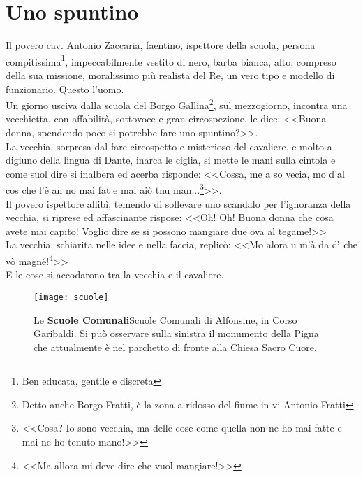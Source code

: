
\chapter{Uno spuntino}
Il povero cav. Antonio Zaccaria, faentino, ispettore della scuola, persona compitissima\footnote{Ben educata, gentile e discreta}, impeccabilmente vestito di nero, barba bianca, alto, compreso della sua missione, moralissimo più realista del Re, un vero tipo e modello di funzionario. Questo l'uomo.\\
\indent Un giorno usciva dalla scuola del Borgo Gallina\footnote{Detto anche Borgo Fratti, è la zona a ridosso del fiume in vi Antonio Fratti}, sul mezzogiorno, incontra una vecchietta, con affabilità, sottovoce e gran circospezione, le dice: <<Buona donna, spendendo poco si potrebbe fare uno spuntino?>>.\\
\indent La vecchia, sorpresa dal fare circospetto e misterioso del cavaliere, e molto a digiuno della lingua di Dante, inarca le ciglia, si mette le mani sulla cintola e come suol dire si inalbera ed acerba risponde: <<Cossa, me a so vecia, mo d'al cos che l'è an no mai fat e mai aiò tnu man...\footnote{<<Cosa? Io sono vecchia, ma delle cose come quella non ne ho mai fatte e mai ne ho tenuto mano!>>}>>.\\
\indent Il povero ispettore allibì, temendo di sollevare uno scandalo per l'ignoranza della vecchia, si riprese ed affascinante rispose: <<Oh! Oh! Buona donna che cosa avete mai capito! Voglio dire se si possono mangiare due ova al tegame!>>\\
\indent La vecchia, schiarita nelle idee e nella faccia, replicò: <<Mo alora u m'à da dì che vò magné!\footnote{<<Ma allora mi deve dire che vuol mangiare!>>}>>\\
\indent E le cose si accodarono tra la vecchia e il cavaliere.

 \begin{figure}[htb]
    \centering
    \texttt{[image: scuole]}
    \caption[Scuole Comunali]{Le \textbf{Scuole Comunali}Scuole Comunali di Alfonsine, in Corso Garibaldi. Si può osservare sulla sinistra il monumento della Pigna che attualmente è nel parchetto di fronte alla Chiesa Sacro Cuore.\label{fig:scuole}}
\end{figure}